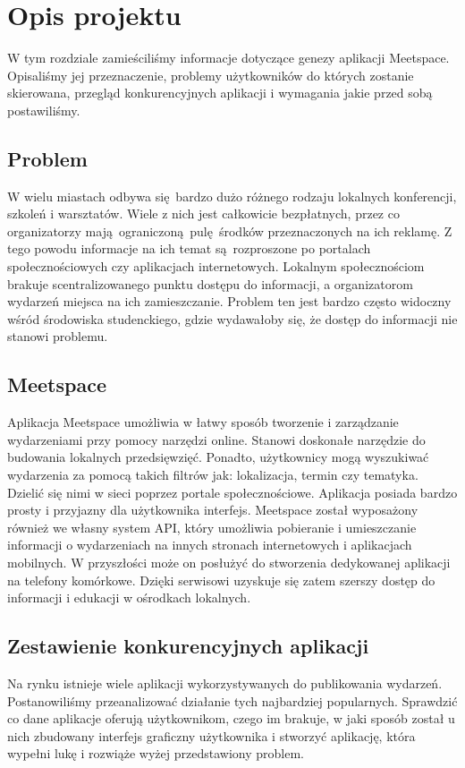 \section{Opis projektu}
W tym rozdziale zamieściliśmy informacje dotyczące genezy aplikacji Meetspace. Opisaliśmy jej przeznaczenie, problemy użytkowników do których zostanie skierowana, przegląd konkurencyjnych aplikacji i wymagania jakie przed sobą postawiliśmy.
\subsection{Problem}
W wielu miastach odbywa się bardzo dużo różnego rodzaju lokalnych konferencji, szkoleń i warsztatów. Wiele z nich jest całkowicie bezpłatnych, przez co organizatorzy mają ograniczoną pulę środków przeznaczonych na ich reklamę. Z tego powodu informacje na ich temat są rozproszone po portalach społecznościowych czy aplikacjach internetowych. Lokalnym społecznościom brakuje scentralizowanego punktu dostępu do informacji, a organizatorom wydarzeń miejsca na ich zamieszczanie. Problem ten jest bardzo często widoczny wśród środowiska studenckiego, gdzie wydawałoby się, że dostęp do informacji nie stanowi problemu.  
\subsection{Meetspace}
Aplikacja Meetspace umożliwia w łatwy sposób tworzenie i zarządzanie wydarzeniami przy pomocy narzędzi online. Stanowi doskonałe narzędzie do budowania lokalnych przedsięwzięć. Ponadto, użytkownicy mogą wyszukiwać wydarzenia za pomocą takich filtrów jak: lokalizacja, termin czy tematyka. Dzielić się nimi w sieci poprzez portale społecznościowe. Aplikacja posiada bardzo prosty i przyjazny dla użytkownika interfejs. Meetspace został wyposażony również we własny system API, który umożliwia pobieranie i umieszczanie informacji o wydarzeniach na innych stronach internetowych i aplikacjach mobilnych. W przyszłości może on posłużyć do stworzenia dedykowanej aplikacji na telefony komórkowe. Dzięki serwisowi uzyskuje się zatem szerszy dostęp do informacji i edukacji w ośrodkach lokalnych.
\subsection{Zestawienie konkurencyjnych aplikacji}
Na rynku istnieje wiele aplikacji wykorzystywanych do publikowania wydarzeń. Postanowiliśmy przeanalizować działanie tych najbardziej popularnych. Sprawdzić co dane aplikacje oferują użytkownikom, czego im brakuje, w jaki sposób został u nich zbudowany interfejs graficzny użytkownika i stworzyć aplikację, która wypełni lukę i rozwiąże wyżej przedstawiony problem.

